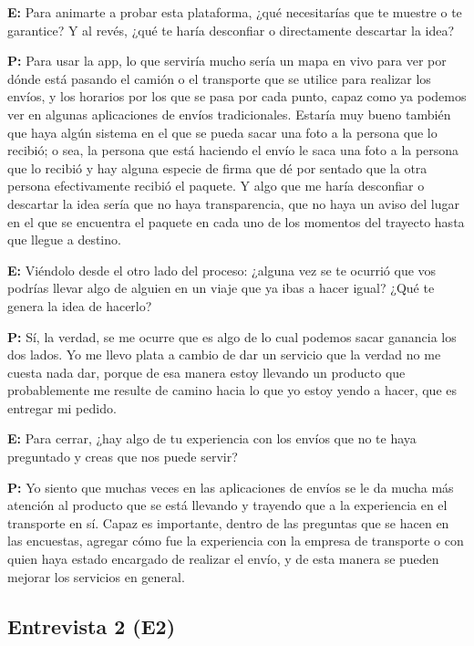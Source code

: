 {\noindent\textbf{E:} Para animarte a probar esta plataforma, ¿qué necesitarías que te muestre o te garantice? Y al revés, ¿qué te haría desconfiar o directamente descartar la idea?

\noindent\textbf{P:} Para usar la app, lo que serviría mucho sería un mapa en vivo para ver por dónde está pasando el camión o el transporte que se utilice para realizar los envíos, y los horarios por los que se pasa por cada punto, capaz como ya podemos ver en algunas aplicaciones de envíos tradicionales. Estaría muy bueno también que haya algún sistema en el que se pueda sacar una foto a la persona que lo recibió; o sea, la persona que está haciendo el envío le saca una foto a la persona que lo recibió y hay alguna especie de firma que dé por sentado que la otra persona efectivamente recibió el paquete. Y algo que me haría desconfiar o descartar la idea sería que no haya transparencia, que no haya un aviso del lugar en el que se encuentra el paquete en cada uno de los momentos del trayecto hasta que llegue a destino.

\noindent\textbf{E:} Viéndolo desde el otro lado del proceso: ¿alguna vez se te ocurrió que vos podrías llevar algo de alguien en un viaje que ya ibas a hacer igual? ¿Qué te genera la idea de hacerlo?

\noindent\textbf{P:} Sí, la verdad, se me ocurre que es algo de lo cual podemos sacar ganancia los dos lados. Yo me llevo plata a cambio de dar un servicio que la verdad no me cuesta nada dar, porque de esa manera estoy llevando un producto que probablemente me resulte de camino hacia lo que yo estoy yendo a hacer, que es entregar mi pedido.

\noindent\textbf{E:} Para cerrar, ¿hay algo de tu experiencia con los envíos que no te haya preguntado y creas que nos puede servir?

\noindent\textbf{P:} Yo siento que muchas veces en las aplicaciones de envíos se le da mucha más atención al producto que se está llevando y trayendo que a la experiencia en el transporte en sí. Capaz es importante, dentro de las preguntas que se hacen en las encuestas, agregar cómo fue la experiencia con la empresa de transporte o con quien haya estado encargado de realizar el envío, y de esta manera se pueden mejorar los servicios en general.

\bigskip

\subsection*{Entrevista 2 (E2)}

}
